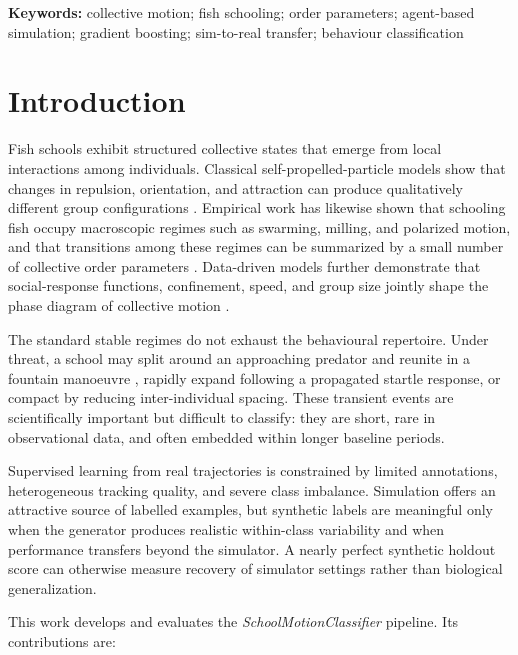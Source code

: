 \documentclass[11pt]{article}
\begin{document}
\noindent\textbf{Keywords:} collective motion; fish schooling; order parameters; agent-based simulation;
gradient boosting; sim-to-real transfer; behaviour classification

\section{Introduction}

Fish schools exhibit structured collective states that emerge from local interactions among individuals.
Classical self-propelled-particle models show that changes in repulsion, orientation, and attraction can
produce qualitatively different group configurations \citep{couzin2002}. Empirical work has likewise
shown that schooling fish occupy macroscopic regimes such as swarming, milling, and polarized motion,
and that transitions among these regimes can be summarized by a small number of collective order
parameters \citep{tunstrom2013}. Data-driven models further demonstrate that social-response functions,
confinement, speed, and group size jointly shape the phase diagram of collective motion
\citep{gautrais2012,calovi2014}.

The standard stable regimes do not exhaust the behavioural repertoire. Under threat, a school may split
around an approaching predator and reunite in a fountain manoeuvre \citep{hall1986}, rapidly expand
following a propagated startle response, or compact by reducing inter-individual spacing. These
transient events are scientifically important but difficult to classify: they are short, rare in
observational data, and often embedded within longer baseline periods.

Supervised learning from real trajectories is constrained by limited annotations, heterogeneous tracking
quality, and severe class imbalance. Simulation offers an attractive source of labelled examples, but
synthetic labels are meaningful only when the generator produces realistic within-class variability and
when performance transfers beyond the simulator. A nearly perfect synthetic holdout score can otherwise
measure recovery of simulator settings rather than biological generalization.

This work develops and evaluates the \textit{SchoolMotionClassifier} pipeline. Its contributions are:
\end{document}
